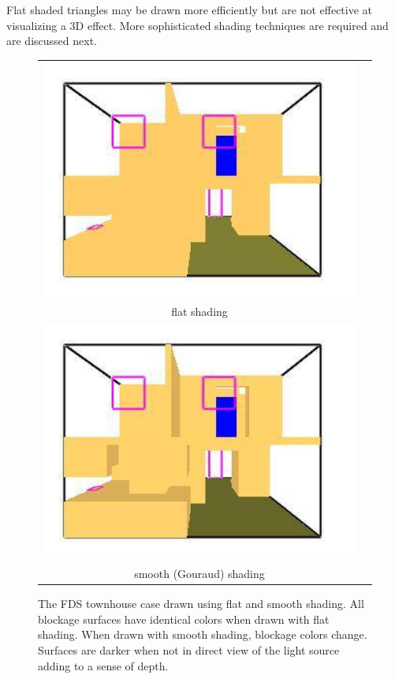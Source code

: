 \documentclass[11pt,twoside]{book}
\begin{document}
Flat shaded triangles may be drawn more efficiently but are not
effective at visualizing a 3D effect.  More sophisticated shading
techniques are required and are discussed next.

\begin{figure}[t]
\begin{center}
\begin{tabular}{cc}
\includegraphics[width=5.0in]{figures/th_unlit}\\
flat shading\\
\includegraphics[width=5.0in]{figures/th_lit}\\
smooth (Gouraud) shading\\
\end{tabular}
\end{center}
\caption [The FDS townhouse case drawn using flat and smooth
shading.] { The FDS townhouse case drawn using flat and smooth
shading. All blockage surfaces have identical colors when drawn
with flat shading.  When drawn with smooth shading, blockage
colors change.  Surfaces are darker when not in direct view of the
light source adding to a sense of depth. } \label{figlighting}
\end{figure}
\end{document}
